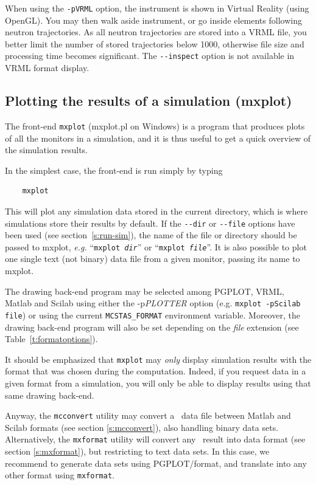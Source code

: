 When using the \verb+-pVRML+ option, the instrument is shown in Virtual Reality (using OpenGL). You may then walk aside instrument, or go inside elements following neutron trajectories. As all neutron trajectories are stored into a VRML file, you better limit the number of stored trajectories below 1000, otherwise file size and processing time becomes significant. The \verb+--inspect+ option is not available in VRML format display.

\subsection{Plotting the results of a simulation (mxplot)}
\label{s:mxplot}

The front-end \verb+mxplot+ (mxplot.pl on Windows) is a program that produces
plots of all the monitors in a simulation, and it is thus useful to get
a quick overview of the simulation results.

In the simplest case, the front-end is run simply by typing
\begin{verbatim}
    mxplot
\end{verbatim}
This will plot any simulation data stored in the current directory,
which is where simulations store their results by default. If the
\verb+--dir+ or \verb+--file+ options have been used (see
section~\ref{s:run-sim}), the name of the file or directory should be
passed to mxplot, {\em e.g.} ``\texttt{mxplot {\it dir}}'' or ``\texttt{mxplot
  {\it file}}''.
It is also possible to plot one single text (not binary) data file from a given monitor, passing its name to mxplot.

The drawing back-end program may be selected among PGPLOT, VRML, Matlab and Scilab using either the -p{\it PLOTTER} option (e.g. \verb+mxplot -pScilab file+) or using the current \verb+MCSTAS_FORMAT+ environment variable.  Moreover, the drawing back-end program will also be set depending on the {\it file} extension (see Table~\ref{t:formatoptions}).

It should be emphasized that \verb+mxplot+ may \emph{only} display simulation results with the format that was chosen during the computation. Indeed, if you request data in a given format from a simulation, you will only be able to display results using that same drawing back-end.

Anyway, the \verb+mcconvert+ utility may convert a \MCX\ data file between Matlab and Scilab formats (see section \ref{s:mcconvert}), also handling binary data sets. Alternatively, the \verb+mxformat+ utility will convert any \MCX\ result into data format (see section \ref{s:mxformat}), but restricting to text data sets. In this case, we recommend to generate data sets using PGPLOT/\MCX  format, and translate into any other format using \verb+mxformat+.

